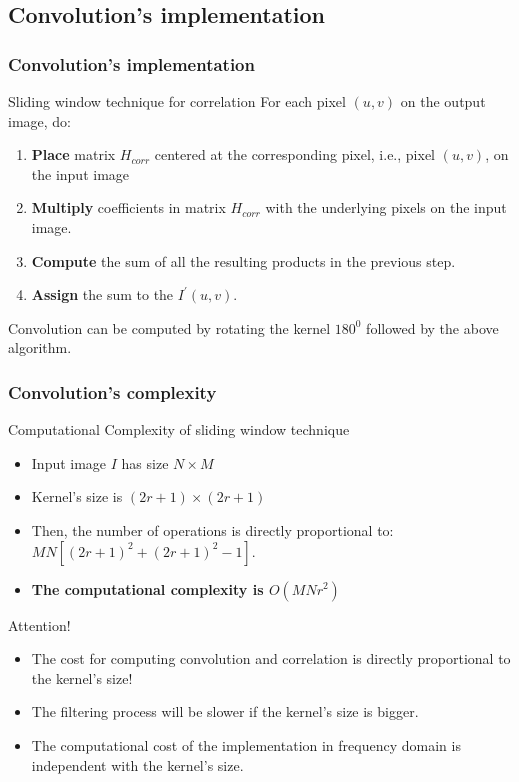 \documentclass[english,11pt,table,handout]{beamer}
\begin{document}
\subsection{Convolution's implementation}
\frame
{
	\frametitle{Convolution's implementation}
	
	\begin{alertblock}{Sliding window technique for correlation}
		For each pixel $(u,v)$ on the output image, do:
		\begin{enumerate}
			\item \textbf{Place} matrix $H_{corr}$ centered at the corresponding pixel, i.e., pixel $(u,v)$, on the input image
			\item \textbf{Multiply} coefficients in matrix $H_{corr}$ with the underlying pixels on the input image.
			\item \textbf{Compute} the sum of all the resulting products in the previous step.
			\item \textbf{Assign} the sum to the $I^{'}(u,v)$.
		\end{enumerate}
	\end{alertblock}
	Convolution can be computed by rotating the kernel $180^0$ followed by the above algorithm.
}
\frame
{
	\frametitle{Convolution's complexity}
	\begin{block}{Computational Complexity of sliding window technique}
		\begin{itemize}
			\item Input image $I$ has size $N \times M$
			\item Kernel's size is $(2r+1) \times (2r+1)$
			\item Then, the number of operations is directly proportional to: $MN[(2r+1)^2 + (2r+1)^2 -1]$.
			\item \alert{\textbf{The computational complexity is $O(MNr^2)$}}
		\end{itemize}
		
	\end{block}
	\begin{alertblock}{Attention!}
		\begin{itemize}
			\item The cost for computing convolution and correlation is \alert{directly proportional} to the kernel's size!
			\item The filtering process will be slower if the kernel's size is bigger.
			\item The computational cost of the implementation in frequency domain is independent with the kernel's size.
		\end{itemize}
	\end{alertblock}
	
}
\end{document}
